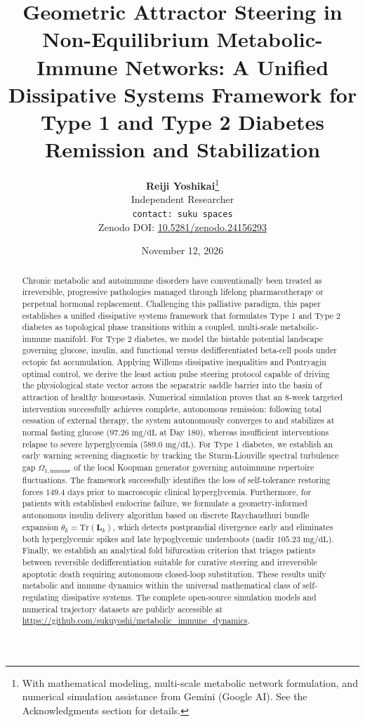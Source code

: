 \documentclass[11pt,a4paper]{article}
\title{\textbf{Geometric Attractor Steering in Non-Equilibrium Metabolic-Immune Networks: A Unified Dissipative Systems Framework for Type 1 and Type 2 Diabetes Remission and Stabilization}}
\author{
    \textbf{Reiji Yoshikai}\thanks{With mathematical modeling, multi-scale metabolic network formulation, and numerical simulation assistance from Gemini (Google AI). See the Acknowledgments section for details.} \\
    \small Independent Researcher \\
    \small \texttt{contact: suku spaces} \\
    \small Zenodo DOI: \href{https://doi.org/10.5281/zenodo.24156293}{10.5281/zenodo.24156293}
}
\date{November 12, 2026}
\begin{document}
\maketitle

\begin{abstract}
Chronic metabolic and autoimmune disorders have conventionally been treated as irreversible, progressive pathologies managed through lifelong pharmacotherapy or perpetual hormonal replacement. Challenging this palliative paradigm, this paper establishes a unified dissipative systems framework that formulates Type 1 and Type 2 diabetes as topological phase transitions within a coupled, multi-scale metabolic-immune manifold. For Type 2 diabetes, we model the bistable potential landscape governing glucose, insulin, and functional versus dedifferentiated beta-cell pools under ectopic fat accumulation. Applying Willems dissipative inequalities and Pontryagin optimal control, we derive the least action pulse steering protocol capable of driving the physiological state vector across the separatric saddle barrier into the basin of attraction of healthy homeostasis. Numerical simulation proves that an 8-week targeted intervention successfully achieves complete, autonomous remission: following total cessation of external therapy, the system autonomously converges to and stabilizes at normal fasting glucose ($97.26\text{ mg/dL}$ at Day 180), whereas insufficient interventions relapse to severe hyperglycemia ($589.0\text{ mg/dL}$). For Type 1 diabetes, we establish an early warning screening diagnostic by tracking the Sturm-Liouville spectral turbulence gap $\Omega_{1,\mathrm{immune}}$ of the local Koopman generator governing autoimmune repertoire fluctuations. The framework successfully identifies the loss of self-tolerance restoring forces $149.4\text{ days}$ prior to macroscopic clinical hyperglycemia. Furthermore, for patients with established endocrine failure, we formulate a geometry-informed autonomous insulin delivery algorithm based on discrete Raychaudhuri bundle expansion $\theta_k = \mathrm{Tr}(\bm{L}_k)$, which detects postprandial divergence early and eliminates both hyperglycemic spikes and late hypoglycemic undershoots (nadir $105.23\text{ mg/dL}$). Finally, we establish an analytical fold bifurcation criterion that triages patients between reversible dedifferentiation suitable for curative steering and irreversible apoptotic death requiring autonomous closed-loop substitution. These results unify metabolic and immune dynamics within the universal mathematical class of self-regulating dissipative systems. The complete open-source simulation models and numerical trajectory datasets are publicly accessible at \url{https://github.com/sukuyoshi/metabolic_immune_dynamics}.
\end{abstract}
\end{document}
